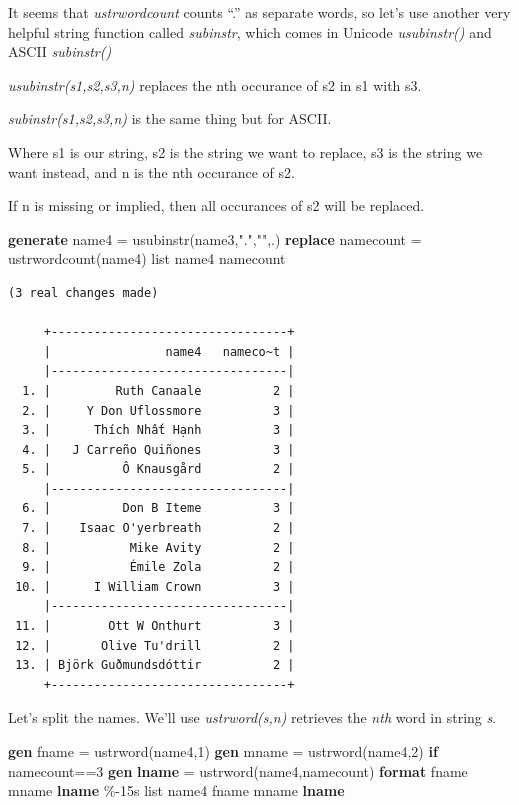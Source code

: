 \documentclass[
]{book}
\newenvironment{Shaded}{\begin{snugshade}}{\end{snugshade}}
\newcommand{\FunctionTok}[1]{\textcolor[rgb]{0.13,0.29,0.53}{\textbf{#1}}}
\newcommand{\KeywordTok}[1]{\textcolor[rgb]{0.13,0.29,0.53}{\textbf{#1}}}
\newcommand{\NormalTok}[1]{#1}
\newcommand{\OtherTok}[1]{\textcolor[rgb]{0.56,0.35,0.01}{#1}}
\newcommand{\StringTok}[1]{\textcolor[rgb]{0.31,0.60,0.02}{#1}}
\begin{document}
It seems that \emph{ustrwordcount} counts ``.'' as separate words, so let's use another very helpful string function called \emph{subinstr}, which comes in Unicode \emph{usubinstr()} and ASCII \emph{subinstr()}

\emph{usubinstr(s1,s2,s3,n)} replaces the nth occurance of s2 in s1 with s3.

\emph{subinstr(s1,s2,s3,n)} is the same thing but for ASCII.

Where s1 is our string, s2 is the string we want to replace, s3 is the string we want instead, and n is the nth occurance of s2.

If n is missing or implied, then all occurances of s2 will be replaced.

\begin{Shaded}
\begin{Highlighting}[]
\KeywordTok{generate}\NormalTok{ name4 = usubinstr(name3,}\StringTok{"."}\NormalTok{,}\StringTok{""}\NormalTok{,.)}
\KeywordTok{replace}\NormalTok{ namecount = ustrwordcount(name4)}
\OtherTok{list}\NormalTok{ name4 namecount}
\end{Highlighting}
\end{Shaded}

\begin{verbatim}
(3 real changes made)

     +---------------------------------+
     |                name4   nameco~t |
     |---------------------------------|
  1. |         Ruth Canaale          2 |
  2. |     Y Don Uflossmore          3 |
  3. |      Thích Nhất Hạnh          3 |
  4. |   J Carreño Quiñones          3 |
  5. |          Ô Knausgård          2 |
     |---------------------------------|
  6. |          Don B Iteme          3 |
  7. |    Isaac O'yerbreath          2 |
  8. |           Mike Avity          2 |
  9. |           Émile Zola          2 |
 10. |      I William Crown          3 |
     |---------------------------------|
 11. |        Ott W Onthurt          3 |
 12. |       Olive Tu'drill          2 |
 13. | Björk Guðmundsdóttir          2 |
     +---------------------------------+
\end{verbatim}

Let's split the names. We'll use \emph{ustrword(s,n)} retrieves the \emph{nth} word in string \emph{s}.

\begin{Shaded}
\begin{Highlighting}[]
\KeywordTok{gen}\NormalTok{ fname = ustrword(name4,1)}
\KeywordTok{gen}\NormalTok{ mname = ustrword(name4,2) }\KeywordTok{if}\NormalTok{ namecount==3}
\KeywordTok{gen} \FunctionTok{lname}\NormalTok{ = ustrword(name4,namecount)}
\KeywordTok{format}\NormalTok{ fname mname }\FunctionTok{lname}\NormalTok{ \%{-}15s}
\OtherTok{list}\NormalTok{ name4 fname mname }\FunctionTok{lname}
\end{Highlighting}
\end{Shaded}
\end{document}

